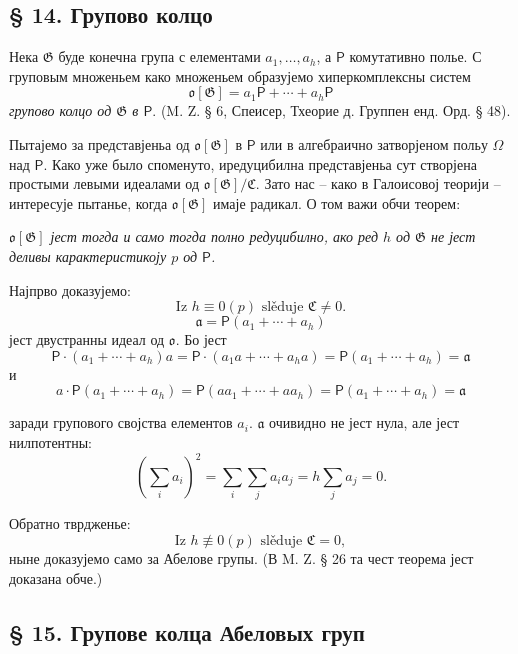 \documentclass[11pt]{article}
\begin{document}
\subsection*{§ 14. Групово колцо}\label{der-gruppenring}

Нека \(\mathfrak G\) буде конечна група с елементами \(a_1,\ldots,a_h\), а \(\mathsf P\) комутативно полье. С груповым множеньем како множеньем образујемо хиперкомплексны систем
\[
\mathfrak o[\mathfrak G]=a_1\mathsf P+\cdots+a_h\mathsf P
\]
\emph{групово колцо од \(\mathfrak G\) в \(\mathsf P\)}. (M. Z. § 6, Спеисер, Тхеорие д. Группен енд. Орд. § 48).

Пытајемо за представјеньа од \(\mathfrak o[\mathfrak G]\) в \(\mathsf P\) или в алгебраично затворјеном польу \(\Omega\) над \(\mathsf P\). Како уже было споменуто, иредуцибилна представјеньа сут створјена простыми левыми идеалами од \(\mathfrak o[\mathfrak G]/\mathfrak C\). Зато нас -- како в Галоисовој теорији -- интересује пытанье, когда \(\mathfrak o[\mathfrak G]\) имаје радикал. О том важи обчи теорем:

\begin{center}
\emph{\(\mathfrak o[\mathfrak G]\) јест тогда и само тогда полно редуцибилно, ако ред \(h\) од \(\mathfrak G\) не јест деливы карактеристикоју \(p\) од \(\mathsf P\).}
\end{center}

Најпрво доказујемо:
\[
\text{Iz } h\equiv0(p) \text{ slěduje } \mathfrak C\ne 0.
\]
\[
\mathfrak a=\mathsf P(a_1+\cdots+a_h)
\]
јест двустранны идеал од \(\mathfrak o\). Бо јест
\[
\mathsf P\cdot(a_1+\cdots+a_h)a
=\mathsf P\cdot(a_1a+\cdots+a_ha)
=\mathsf P(a_1+\cdots+a_h)=\mathfrak a
\]
и
\[
a\cdot\mathsf P(a_1+\cdots+a_h)
=\mathsf P(aa_1+\cdots+aa_h)
=\mathsf P(a_1+\cdots+a_h)=\mathfrak a
\]

заради групового својства елементов \(a_i\). \(\mathfrak a\) очивидно не јест нула, але јест нилпотентны:
\[
\left(\sum_i a_i\right)^2=\sum_i\sum_j a_i a_j
=h\sum_j a_j=0.
\]

Обратно тврдженье:
\[
\text{Iz } h\not\equiv0(p) \text{ slěduje } \mathfrak C=0,
\]
ныне доказујемо само за Абелове групы. (В M. Z. § 26 та чест теорема јест доказана обче.)

\subsection*{§ 15. Групове колца Абеловых груп}\label{die-gruppenringe-abelscher-gruppen}
\end{document}
